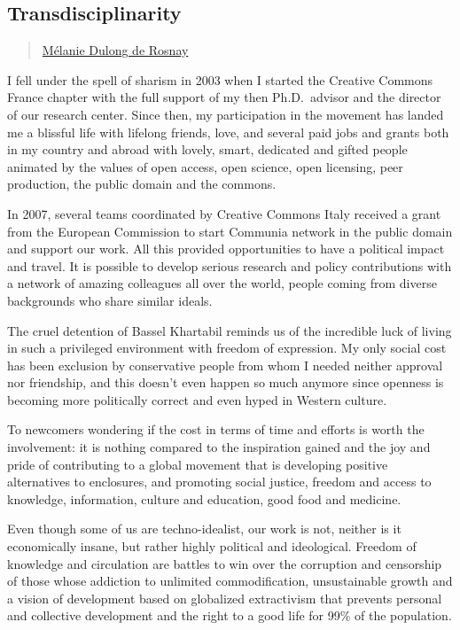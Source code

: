 \subsection{Transdisciplinarity}\label{transdisciplinarity}

\begin{quote}
\hyperlink{melanie-dulong-de-rosnay}{Mélanie
Dulong de Rosnay}
\end{quote}

I fell under the spell of sharism in 2003 when I started the Creative
Commons France chapter with the full support of my then Ph.D.~advisor
and the director of our research center. Since then, my participation in
the movement has landed me a blissful life with lifelong friends, love,
and several paid jobs and grants both in my country and abroad with
lovely, smart, dedicated and gifted people animated by the values of
open access, open science, open licensing, peer production, the public
domain and the commons.

In 2007, several teams coordinated by Creative Commons Italy received a
grant from the European Commission to start Communia network in the
public domain and support our work. All this provided opportunities to
have a political impact and travel. It is possible to develop serious
research and policy contributions with a network of amazing colleagues
all over the world, people coming from diverse backgrounds who share
similar ideals.

The cruel detention of Bassel Khartabil reminds us of the incredible
luck of living in such a privileged environment with freedom of
expression. My only social cost has been exclusion by conservative
people from whom I needed neither approval nor friendship, and this
doesn't even happen so much anymore since openness is becoming more
politically correct and even hyped in Western culture.

To newcomers wondering if the cost in terms of time and efforts is worth
the involvement: it is nothing compared to the inspiration gained and
the joy and pride of contributing to a global movement that is
developing positive alternatives to enclosures, and promoting social
justice, freedom and access to knowledge, information, culture and
education, good food and medicine.

Even though some of us are techno-idealist, our work is not, neither is
it economically insane, but rather highly political and ideological.
Freedom of knowledge and circulation are battles to win over the
corruption and censorship of those whose addiction to unlimited
commodification, unsustainable growth and a vision of development based
on globalized extractivism that prevents personal and collective
development and the right to a good life for 99\% of the population.
